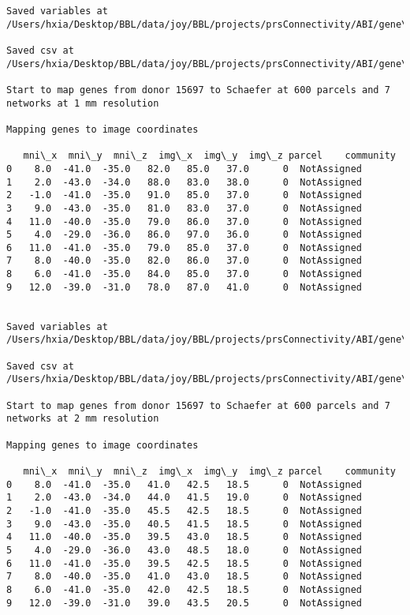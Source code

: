 \documentclass[11pt]{article}
\begin{document}
\begin{Verbatim}[commandchars=\\\{\}]
Saved variables at /Users/hxia/Desktop/BBL/data/joy/BBL/projects/prsConnectivity/ABI/gene\_mapping/15697donor\_400Parcels\_17Network\_2mm.pkl

Saved csv at /Users/hxia/Desktop/BBL/data/joy/BBL/projects/prsConnectivity/ABI/gene\_mapping/15697donor\_400Parcels\_17Network\_2mm.csv

Start to map genes from donor 15697 to Schaefer at 600 parcels and 7 networks at 1 mm resolution

Mapping genes to image coordinates

   mni\_x  mni\_y  mni\_z  img\_x  img\_y  img\_z parcel    community
0    8.0  -41.0  -35.0   82.0   85.0   37.0      0  NotAssigned
1    2.0  -43.0  -34.0   88.0   83.0   38.0      0  NotAssigned
2   -1.0  -41.0  -35.0   91.0   85.0   37.0      0  NotAssigned
3    9.0  -43.0  -35.0   81.0   83.0   37.0      0  NotAssigned
4   11.0  -40.0  -35.0   79.0   86.0   37.0      0  NotAssigned
5    4.0  -29.0  -36.0   86.0   97.0   36.0      0  NotAssigned
6   11.0  -41.0  -35.0   79.0   85.0   37.0      0  NotAssigned
7    8.0  -40.0  -35.0   82.0   86.0   37.0      0  NotAssigned
8    6.0  -41.0  -35.0   84.0   85.0   37.0      0  NotAssigned
9   12.0  -39.0  -31.0   78.0   87.0   41.0      0  NotAssigned


Saved variables at /Users/hxia/Desktop/BBL/data/joy/BBL/projects/prsConnectivity/ABI/gene\_mapping/15697donor\_600Parcels\_7Network\_1mm.pkl

Saved csv at /Users/hxia/Desktop/BBL/data/joy/BBL/projects/prsConnectivity/ABI/gene\_mapping/15697donor\_600Parcels\_7Network\_1mm.csv

Start to map genes from donor 15697 to Schaefer at 600 parcels and 7 networks at 2 mm resolution

Mapping genes to image coordinates

   mni\_x  mni\_y  mni\_z  img\_x  img\_y  img\_z parcel    community
0    8.0  -41.0  -35.0   41.0   42.5   18.5      0  NotAssigned
1    2.0  -43.0  -34.0   44.0   41.5   19.0      0  NotAssigned
2   -1.0  -41.0  -35.0   45.5   42.5   18.5      0  NotAssigned
3    9.0  -43.0  -35.0   40.5   41.5   18.5      0  NotAssigned
4   11.0  -40.0  -35.0   39.5   43.0   18.5      0  NotAssigned
5    4.0  -29.0  -36.0   43.0   48.5   18.0      0  NotAssigned
6   11.0  -41.0  -35.0   39.5   42.5   18.5      0  NotAssigned
7    8.0  -40.0  -35.0   41.0   43.0   18.5      0  NotAssigned
8    6.0  -41.0  -35.0   42.0   42.5   18.5      0  NotAssigned
9   12.0  -39.0  -31.0   39.0   43.5   20.5      0  NotAssigned



\end{Verbatim}
\end{document}
